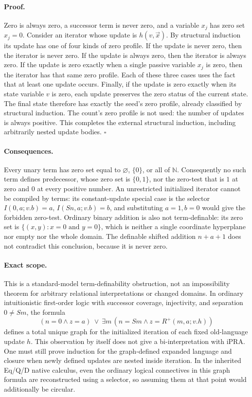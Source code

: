 \documentclass[11pt,letterpaper]{article}
\theoremstyle{definition}\newtheorem{definition}[theorem]{Definition}
\theoremstyle{remark}\newtheorem{remark}[theorem]{Remark}
\begin{document}
\paragraph{Proof.}
Zero is always zero, a successor term is never zero, and a variable $x_j$
has zero set $x_j=0$.  Consider an iterator whose update is $h(v,\vec x)$.
By structural induction its update has one of four kinds of zero profile.
If the update is never zero, then the iterator is never zero.  If the
update is always zero, then the iterator is always zero.  If the update
is zero exactly when a single passive variable $x_j$ is zero, then the
iterator has that same zero profile.  Each of these three cases uses the
fact that at least one update occurs.  Finally, if the update is zero
exactly when its state variable $v$ is zero, each update preserves the
zero status of the current state.  The final state therefore has exactly
the seed's zero profile, already classified by structural induction.
The count's zero profile is not used: the number of updates is always
positive.  This completes the external structural induction, including
arbitrarily nested update bodies. \hfill$\square$

\paragraph{Consequences.}
Every unary term has zero set equal to $\varnothing$, $\{0\}$, or all
of $\mathbb N$.  Consequently no such term defines predecessor, whose
zero set is $\{0,1\}$, nor the zero-test that is $1$ at zero and $0$
at every positive number.  An unrestricted initialized iterator cannot
be compiled by terms: its constant-update special case is the selector
$I(0,a;v.b)=a$, $I(Sn,a;v.b)=b$, and substituting $a=1,b=0$ would
give the forbidden zero-test.
Ordinary binary addition is also not term-definable: its zero set is
$\{(x,y):x=0\text{ and }y=0\}$, which is neither a single coordinate
hyperplane nor empty nor the whole domain.  The definable shifted addition
$n+a+1$ does not contradict this conclusion, because it is never zero.

\paragraph{Exact scope.}
This is a standard-model term-definability obstruction, not an
impossibility theorem for arbitrary relational interpretations or
changed domains.  In ordinary intuitionistic first-order logic with
successor coverage, injectivity, and separation $0\ne Sm$, the formula
\[
 (n=0\wedge z=a)\ \vee\
 \exists m\,(n=Sm\wedge z=R^+(m,a;v.h))
\]
defines a total unique graph for the initialized iteration of each
fixed old-language update $h$.  This observation by itself does not
give a bi-interpretation with iPRA.  One must still prove induction for
the graph-defined expanded language and closure when newly defined
updates are nested inside iteration.  In the inherited Eq/Q/D native
calculus, even the ordinary logical connectives in this graph formula
are reconstructed using a selector, so assuming them at that point
would additionally be circular.
\end{document}
